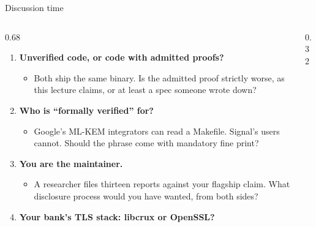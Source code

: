 \ifdefined\PRESENTATION\else\PassOptionsToClass{handout}{beamer}\fi\documentclass[aspectratio=169, lualatex]{beamer}
\begin{document}
\begin{frame}{Discussion time}
	\begin{columns}[c]
		\begin{column}{0.68\textwidth}
			\begin{enumerate}
				\item \textbf{Unverified code, or code with admitted proofs?}
				      \begin{itemize}
					      \item Both ship the same binary. Is the admitted proof strictly worse, as this lecture claims, or at least a spec someone wrote down?
				      \end{itemize}
				\item \textbf{Who is ``formally verified'' for?}
				      \begin{itemize}
					      \item Google's ML-KEM integrators can read a Makefile. Signal's users cannot. Should the phrase come with mandatory fine print?
				      \end{itemize}
				\item \textbf{You are the maintainer.}
				      \begin{itemize}
					      \item A researcher files thirteen reports against your flagship claim. What disclosure process would you have wanted, from both sides?
				      \end{itemize}
				\item \textbf{Your bank's TLS stack: libcrux or OpenSSL?}
			\end{enumerate}
		\end{column}
		\begin{column}{0.32\textwidth}
		\end{column}
	\end{columns}
\end{frame}
\end{document}
